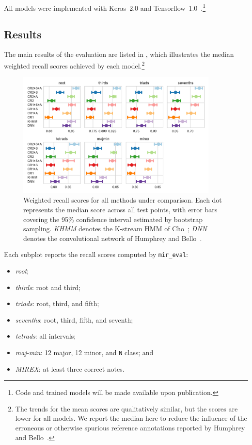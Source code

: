 \documentclass{article}
\begin{document}

All models were implemented with Keras~2.0 and Tensorflow~1.0~\cite{chollet2015keras, tensorflow2015-whitepaper}.\footnote{Code and trained models will be made available upon publication.}

\subsection{Results}

The main results of the evaluation are listed in , which illustrates the median weighted recall scores achieved by each model.\footnote{The trends for the mean scores are qualitatively similar, but the scores are lower for all models. We report the median here to reduce the influence of the erroneous or otherwise spurious reference annotations reported by Humphrey and Bello~\cite{humphrey2015four}.}
\begin{figure}[t]
    \centering
    \includegraphics[width=0.9\textwidth]{crnn-scores}
    \caption{Weighted recall scores for all methods under comparison.  Each dot represents the median score across all test points, with error bars covering the 95\% confidence interval estimated by bootstrap sampling.
        \emph{KHMM} denotes the K-stream HMM of Cho~\cite{cho2014improved}; \emph{DNN} denotes the convolutional network of Humphrey and Bello~\cite{humphrey2015four}.\label{fig:results}}
\end{figure}
Each subplot reports the recall scores computed by \texttt{mir\_eval}:
\begin{itemize}
    \item \emph{root};
    \item \emph{thirds}: root and third;
    \item \emph{triads}: root, third, and fifth;
    \item \emph{sevenths}: root, third, fifth, and seventh;
    \item \emph{tetrads}: all intervals;
    \item \emph{maj-min}: 12 major, 12 minor, and \texttt{N} class; and
    \item \emph{MIREX}: at least three correct notes.
\end{itemize}
\end{document}
